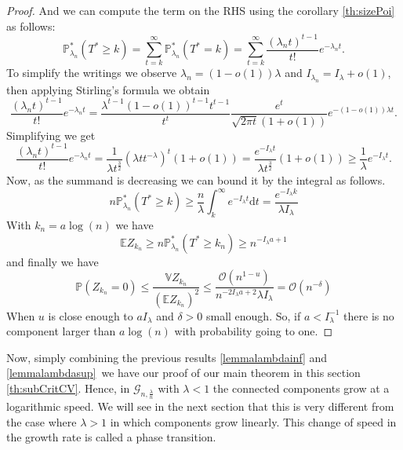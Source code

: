 \begin{proof}
	And we can compute the term on the RHS using the corollary \ref{th:sizePoi} as follows:
	\begin{equation}
		\mathbb{P}_{\lambda_n}^*(T^* \geq k)
		 = \sum_{t=k}^{\infty} \mathbb{P}_{\lambda_n}^*(T^* = k)
		 = \sum_{t=k}^{\infty} \frac{(\lambda_n t)^{t-1}}{t!} e^{-\lambda_n t}.
	\end{equation}
	To simplify the writings we observe $\lambda_n = (1-o(1))\lambda$ and $I_{\lambda_n} = I_{\lambda} + o(1)$, then applying Stirling's formula we obtain
	\begin{equation}
		\frac{(\lambda_n t)^{t-1}}{t!} e^{-\lambda_n t}
		= \frac{\lambda^{t-1} (1-o(1))^{t-1}t^{t-1}}{t^t} \frac{e^t}{\sqrt{2\pi t}(1 + o(1))} e^{-(1-o(1))\lambda t}.	
	\end{equation}
	Simplifying we get
	\begin{equation}
		\frac{(\lambda_n t)^{t-1}}{t!} e^{-\lambda_n t}
		= \frac{1}{\lambda t^{\frac{3}{2}}}(\lambda t t^{-\lambda})^t (1 + o(1))
		= \frac{e^{-I_{\lambda} t }}{\lambda t^{\frac{3}{2}}} (1 + o(1)) \geq \frac{1}{\lambda}e^{-I_{\lambda} t}.
	\end{equation}
	Now, as the summand is decreasing we can bound it by the integral as follows.
	\begin{equation}
		n\mathbb{P}_{\lambda_n}^*(T^* \geq k)
		\geq \frac{n}{\lambda} \int_{k}^{\infty} e^{-I_{\lambda} t} \mathrm{d}t
		 = \frac{e^{-I_{\lambda} k}}{\lambda I_{\lambda}}
	\end{equation}
	With $k_n = a\log(n)$ we have 
	\begin{equation}
		\mathbb{E} Z_{k_n} \geq n\mathbb{P}_{\lambda_n}^*(T^* \geq k_n) \geq n^{-I_{\lambda} a + 1}
	\end{equation}
	and finally we have
	\begin{equation}
		\mathbb{P}(Z_{k_n} = 0) \leq \frac{\mathbb{V}Z_{k_n}}{(\mathbb{E}Z_{k_n})^2} \leq \frac{\mathcal{O}(n^{ 1 - u})}{n^{-2I_{\lambda}a + 2} \lambda I_{\lambda}} 	
		= \mathcal{O}(n^{ -\delta})
	\end{equation}
	When $u$ is close enough to $aI_{\lambda}$ and $\delta >0$ small enough.
	\newline
	So, if $a<I_{\lambda}^{-1}$ there is no component larger than $a\log(n)$ with probability going to one.
\end{proof}
Now, simply combining the previous results \eqref{lemmalambdainf} and \eqref{lemmalambdasup} we have our proof of our main theorem in this section \eqref{th:subCritCV}.
Hence, in $\mathcal{G}_{n, \frac{\lambda}{n}}$ with $\lambda < 1$ the connected components grow at a logarithmic speed. We will see in the next section that this is very different from the case where $\lambda > 1$ in which components grow linearly.
This change of speed in the growth rate is called a phase transition.

